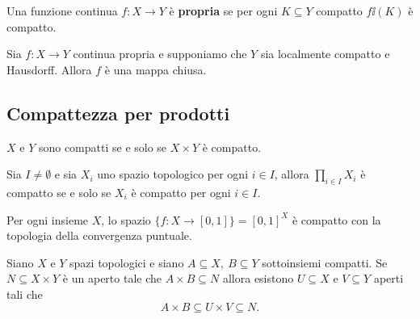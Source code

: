\begin{multicols*}{2}
\begin{definition}
Una funzione continua $f:X\to Y$ \`e \textbf{propria} se per ogni $K\subseteq Y$ compatto $f\ii(K)$ \`e compatto.
\end{definition}

\begin{proposition}\label{ProprieInT2LocalmenteCompattoSonoChiuse}
Sia $f:X\to Y$ continua propria e supponiamo che $Y$ sia localmente compatto e Hausdorff. Allora $f$ \`e una mappa chiusa.
\end{proposition}

\subsection{Compattezza per prodotti}
\begin{theorem}
$X$ e $Y$ sono compatti se e solo se $X\times Y$ è compatto.
\end{theorem}

\begin{theorem}[Tychonoff]\label{TeoremaDiTychonoff}
Sia $I\neq \emptyset$ e sia $X_i$ uno spazio topologico per ogni $i\in I$, allora $\prod_{i\in I}X_i$ è compatto se e solo se $X_i$ è compatto per ogni $i\in I$.
\end{theorem}
\begin{corollary}
Per ogni insieme $X$, lo spazio $\{f:X\to [0,1]\}=[0,1]^X$ è compatto con la topologia della convergenza puntuale.
\end{corollary}

\begin{theorem}[Wallace]\label{TeoremaWallace}
Siano $X$ e $Y$ spazi topologici e siano $A\subseteq X,\ B\subseteq Y$ sottoinsiemi compatti. Se $N\subseteq X\times Y$ \`e un aperto tale che $A\times B\subseteq N$ allora esistono $U\subseteq X$ e $V\subseteq Y$ aperti tali che
\[A\times B\subseteq U\times V\subseteq N.\]
\end{theorem}



\end{multicols*}

